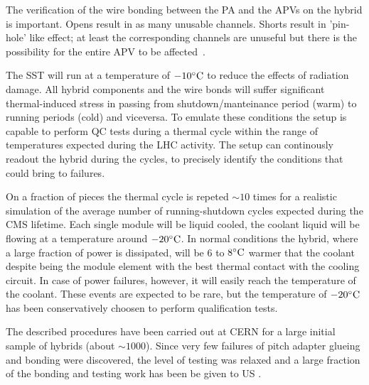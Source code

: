 The verification of the wire bonding between the PA and the APVs on
the hybrid is important. Opens result in as many unusable 
channels. Shorts result in 'pin-hole' like effect; at
least the corresponding channels are unuseful but there is the
possibility for the entire APV to be affected~\cite{hip}. 

The SST will run at a temperature of $-10^{\circ}{\rm C}$ to reduce the
effects of radiation damage. All hybrid components and the wire bonds
will suffer significant thermal-induced stress in passing from
shutdown/manteinance period (warm) to running periods (cold) and viceversa.
To emulate these conditions the setup is capable to perform QC tests
during a thermal cycle within the range of temperatures expected
during the LHC activity. The setup
can continously readout the hybrid during the cycles, to precisely
identify the conditions that could bring to failures.

On a fraction of pieces the thermal cycle is repeted $\sim10$ times
for a realistic simulation of the average number of running-shutdown cycles
expected during the CMS lifetime. Each single module will be liquid cooled,
the coolant liquid will be flowing at a temperature around
$-20^{\circ}{\rm C}$. In normal conditions the hybrid, where a large fraction 
of power is dissipated, will be $6$ to $8^{\circ}{\rm C}$ warmer that the
coolant despite being the module element with the best thermal contact
with the cooling circuit. In case of power failures, however, it will
easily reach the temperature of the coolant. These events are
expected to be rare, but the temperature of $-20^{\circ}{\rm C}$ has been
conservatively choosen to perform qualification tests.


The described procedures have been carried out at CERN for a large
initial sample of hybrids (about $\sim1000$). Since very few 
failures of pitch adapter glueing and bonding were discovered, the
level of testing was relaxed and a large fraction of the bonding and
testing work has been be given to US \fixme.

